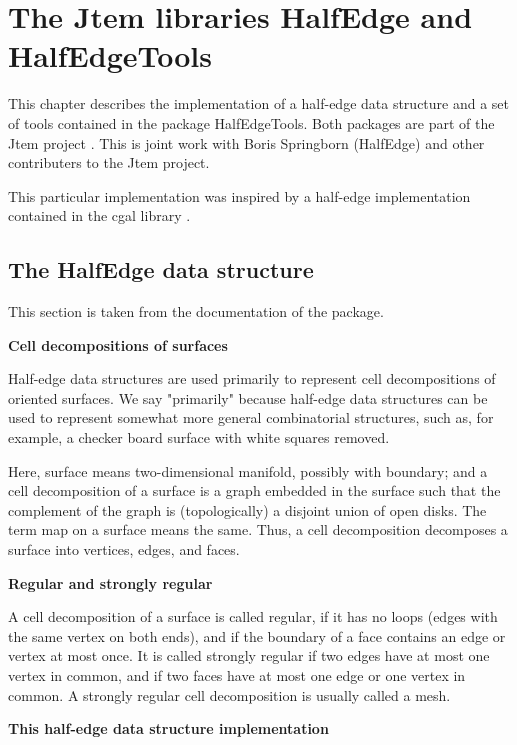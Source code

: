 
\chapter{The {\sc Jtem} libraries {\sc HalfEdge} and {\sc HalfEdgeTools}}

This chapter describes the implementation of a half-edge data structure and a set of tools
contained in the package {\sc HalfEdgeTools}. Both packages are part of the {\sc Jtem} project
\cite{JtemWebsite}. This is joint work with Boris Springborn ({\sc HalfEdge}) and
other contributers to the {\sc Jtem} project.

This particular implementation was inspired by a half-edge implementation contained in
the {\sc cgal} library \cite{CgalWebsite}.


\label{sec:halfedge_halfedgetools}
\section{The {\sc HalfEdge} data structure}

This section is taken from the documentation of the package.

{\bf Cell decompositions of surfaces}

Half-edge data structures are used primarily to represent cell decompositions of oriented surfaces.
We say "primarily" because half-edge data structures can be used to represent somewhat more general
combinatorial structures, such as, for example, a checker board surface with white squares removed.

Here, surface means two-dimensional manifold, possibly with boundary; and a cell decomposition 
of a surface is a graph embedded in the surface such that the complement of the graph is 
(topologically) a disjoint union of open disks. The term map on a surface means the same. 
Thus, a cell decomposition decomposes a surface into vertices, edges, and faces.

{\bf Regular and strongly regular}

A cell decomposition of a surface is called regular, if it has no loops (edges with the same vertex 
on both ends), and if the boundary of a face contains an edge or vertex at most once. It is called 
strongly regular if two edges have at most one vertex in common, and if two faces have at most 
one edge or one vertex in common. A strongly regular cell decomposition is usually called a mesh.

{\bf This half-edge data structure implementation}

